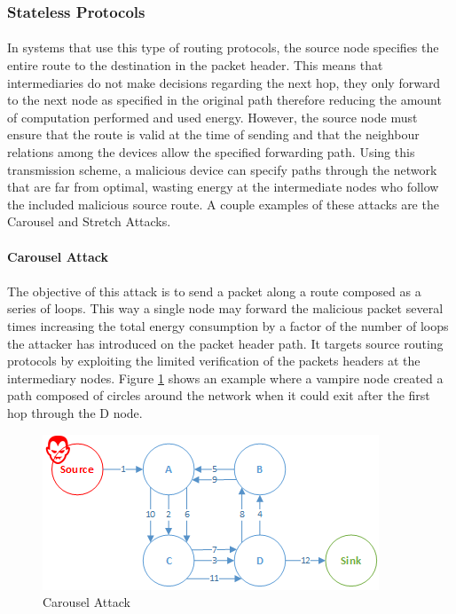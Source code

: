 \subsubsection{Stateless Protocols}
\paragraph{}
In systems that use this type of routing protocols, the source node specifies the entire route to the destination in the packet header. This means that intermediaries do not make decisions regarding the next hop, they only forward to the next node as specified in the original path therefore reducing the amount of computation performed and used energy. However, the source node must ensure that the route is valid at the time of sending and that the neighbour relations among the devices allow the specified forwarding path. Using this transmission scheme, a malicious device can specify paths through the network that are far from optimal, wasting energy at the intermediate nodes who follow the included malicious source route. A couple examples of these attacks are the Carousel and Stretch Attacks.

\paragraph{\textbf{Carousel Attack}}
\paragraph{}
The objective of this attack is to send a packet along a route composed as a series of loops. This way a single node may forward the malicious packet several times increasing the total energy consumption by a factor of the number of loops the attacker has introduced on the packet header path. It targets source routing protocols by exploiting the limited verification of the packets headers at the intermediary nodes. Figure \ref{fig:carousel_attack} shows an example where a vampire node created a path composed of circles around the network when it could exit after the first hop through the D node.
 
\begin{figure}[h]
  \centering
  \includegraphics[width=0.8\linewidth]{figures/Carousel_Attack.png}
  \caption{Carousel Attack}
  \label{fig:carousel_attack}
\end{figure}

